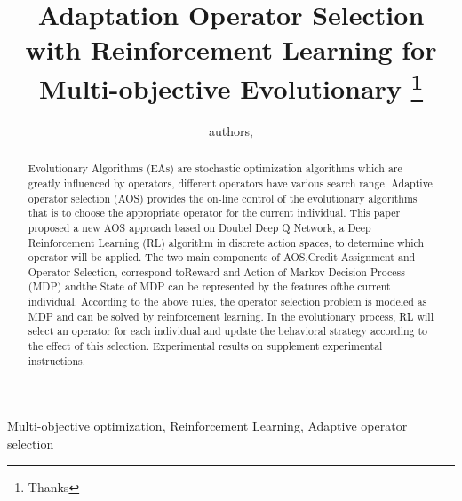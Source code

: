 \documentclass[journal]{IEEEtran}
\newcommand{\TODO}[1]{\textcolor[rgb]{1.00,0.40,0.22}{#1}}
\begin{document}
\title{{Adaptation Operator Selection with Reinforcement Learning for Multi-objective Evolutionary}
  \thanks{Thanks}}
\author{
  authors,
}%



\maketitle

\begin{abstract}
  Evolutionary Algorithms (EAs) are stochastic optimization algorithms which are greatly influenced by operators, different operators have various search range.
  Adaptive operator selection (AOS) provides the on-line control of the evolutionary algorithms that is to choose the appropriate operator for the current individual.
  This paper proposed a new AOS approach based on Doubel Deep Q Network, a Deep Reinforcement Learning (RL) algorithm in discrete action spaces, to determine which operator will be applied.
  The two main components of AOS,Credit Assignment and Operator Selection, correspond toReward and Action of Markov Decision Process (MDP) andthe State of MDP can be represented by the  features ofthe current individual.
  According to the above rules, the operator selection problem is modeled as MDP and can be solved by reinforcement learning.
  In the evolutionary process, RL will select an operator for each individual and update the behavioral strategy according to the effect of this selection.
  Experimental results on \TODO{supplement experimental instructions}.
\end{abstract}

\begin{IEEEkeywords}
  Multi-objective optimization, Reinforcement Learning, Adaptive operator selection
\end{IEEEkeywords}
\end{document}
